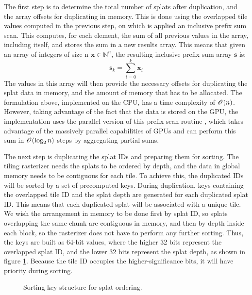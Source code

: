 The first step is to determine the total number of splats after duplication, and the array offsets for duplicating in memory. This is done using the overlapped tile values computed in the previous step, on which is applied an inclusive prefix sum scan. This computes, for each element, the sum of all previous values in the array, including itself, and stores the sum in a new results array. This means that given an array of integers of size n $\bm{x} \in \mathbb{N}^n$, the resulting inclusive prefix sum array $\bm{s}$ is:
\[
\bm{s}_k = \sum_{i=0}^{k} \bm{x}_i
\]
The values in this array will then provide the necessary offsets for duplicating the splat data in memory, and the amount of memory that has to be allocated. The formulation above, implemented on the CPU, has a time complexity of $\mathcal{O} (n)$. However, taking advantage of the fact that the data is stored on the GPU, the implementation uses the parallel version of this prefix scan routine \cite{Merrill2016SinglepassPP}, which takes advantage of the massively parallel capabilities of GPUs and can perform this sum in $\mathcal{O} (\log_2 n)$ steps by aggregating partial sums.

The next step is duplicating the splat IDs and preparing them for sorting. The tiling rasterizer needs the splats to be ordered by depth, and the data in global memory needs to be contiguous for each tile. To achieve this, the duplicated IDs will be sorted by a set of precomputed keys. During duplication, keys containing the overlapped tile ID and the splat depth are generated for each duplicated splat ID. This means that each duplicated splat will be associated with a unique tile. We wish the arrangement in memory to be done first by splat ID, so splats overlapping the same chunk are contiguous in memory, and then by depth inside each block, so the rasterizer does not have to perform any further sorting. Thus, the keys are built as 64-bit values, where the higher 32 bits represent the overlapped splat ID, and the lower 32 bits represent the splat depth, as shown in figure \ref{fig:sortkey}. Because the tile ID occupies the higher-significance bits, it will have priority during sorting.

\begin{figure}[H]
    \centering
    
    \caption{Sorting key structure for splat ordering.}
    \label{fig:sortkey}
\end{figure}


